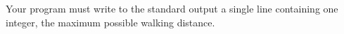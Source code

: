 Your program must write to the standard output a single line containing one integer, the maximum possible walking distance.